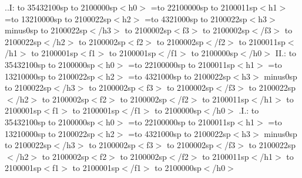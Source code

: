 \vfill\eject\noindent
..I:%
\hbox to 35432100sp{%
  \hbox to 2100000sp{$<$h0$>$}%
  =\hbox to 22100000sp{%
    \hbox to 2100011sp{$<$h1$>$}%
    =\hbox to 13210000sp{%
      \hbox to 2100022sp{$<$h2$>$}%
      =\hbox to 4321000sp{%
        \hbox to 2100022sp{$<$h3$>$}%
         minus0sp
        \hbox to 2100022sp{$<$/h3$>$}%
      }%
      \immediate
      \hbox to 2100002sp{$<$f3$>$}%
      \pdfrefxform\pdflastxform%
      \hbox to 2100002sp{$<$/f3$>$}%
      \hbox to 2100022sp{$<$/h2$>$}%
    }%
    \hbox to 2100002sp{$<$f2$>$}%
    \pdfrefxform\pdflastxform%
    \hbox to 2100002sp{$<$/f2$>$}%
    \hbox to 2100011sp{$<$/h1$>$}%
  }%
  \hbox to 2100001sp{$<$f1$>$}%
  \pdfrefxform\pdflastxform%
  \hbox to 2100001sp{$<$/f1$>$}%
  \hbox to 2100000sp{$<$/h0$>$}%
}
\vfill\eject\noindent
II.:%
\hbox to 35432100sp{%
  \hbox to 2100000sp{$<$h0$>$}%
  =\hbox to 22100000sp{%
    \hbox to 2100011sp{$<$h1$>$}%
    =\hbox to 13210000sp{%
      \hbox to 2100022sp{$<$h2$>$}%
      =\hbox to 4321000sp{%
        \hbox to 2100022sp{$<$h3$>$}%
         minus0sp
        \hbox to 2100022sp{$<$/h3$>$}%
      }%
      \hbox to 2100002sp{$<$f3$>$}%
      \pdfrefxform\pdflastxform%
      \hbox to 2100002sp{$<$/f3$>$}%
      \hbox to 2100022sp{$<$/h2$>$}%
    }%
    \immediate
    \hbox to 2100002sp{$<$f2$>$}%
    \pdfrefxform\pdflastxform%
    \hbox to 2100002sp{$<$/f2$>$}%
    \hbox to 2100011sp{$<$/h1$>$}%
  }%
  \immediate
  \hbox to 2100001sp{$<$f1$>$}%
  \pdfrefxform\pdflastxform%
  \hbox to 2100001sp{$<$/f1$>$}%
  \hbox to 2100000sp{$<$/h0$>$}%
}
\vfill\eject\noindent
.I.:%
\hbox to 35432100sp{%
  \hbox to 2100000sp{$<$h0$>$}%
  =\hbox to 22100000sp{%
    \hbox to 2100011sp{$<$h1$>$}%
    =\hbox to 13210000sp{%
      \hbox to 2100022sp{$<$h2$>$}%
      =\hbox to 4321000sp{%
        \hbox to 2100022sp{$<$h3$>$}%
         minus0sp
        \hbox to 2100022sp{$<$/h3$>$}%
      }%
      \hbox to 2100002sp{$<$f3$>$}%
      \pdfrefxform\pdflastxform%
      \hbox to 2100002sp{$<$/f3$>$}%
      \hbox to 2100022sp{$<$/h2$>$}%
    }%
    \immediate
    \hbox to 2100002sp{$<$f2$>$}%
    \pdfrefxform\pdflastxform%
    \hbox to 2100002sp{$<$/f2$>$}%
    \hbox to 2100011sp{$<$/h1$>$}%
  }%
  \hbox to 2100001sp{$<$f1$>$}%
  \pdfrefxform\pdflastxform%
  \hbox to 2100001sp{$<$/f1$>$}%
  \hbox to 2100000sp{$<$/h0$>$}%
}
